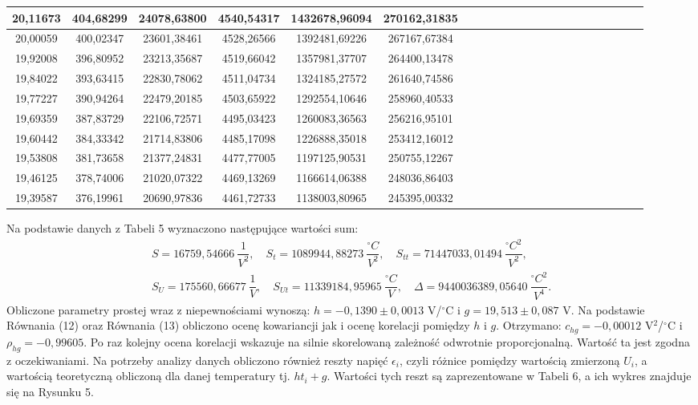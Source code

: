 \documentclass[10pt,a4paper]{article}
\begin{document}
\begin{center}
\begin{table}[h!]
\begin{tabular}{|c|c|c|c|c|c|c|c|c|c|c|c|c|c|c|c|c|c|c|c|c|c|}
20,11673 & 404,68299                & 24078,63800                 & 4540,54317                  & 1432678,96094 & 270162,31835 \\ \hline
20,00059 & 400,02347                & 23601,38461                 & 4528,26566                  & 1392481,69226 & 267167,67384 \\ \hline
19,92008 & 396,80952                & 23213,35687                 & 4519,66042                  & 1357981,37707 & 264400,13478 \\ \hline
19,84022 & 393,63415                & 22830,78062                 & 4511,04734                  & 1324185,27572 & 261640,74586 \\ \hline
19,77227 & 390,94264                & 22479,20185                 & 4503,65922                  & 1292554,10646 & 258960,40533 \\ \hline
19,69359 & 387,83729                & 22106,72571                 & 4495,03423                  & 1260083,36563 & 256216,95101 \\ \hline
19,60442 & 384,33342                & 21714,83806                 & 4485,17098                  & 1226888,35018 & 253412,16012 \\ \hline
19,53808 & 381,73658                & 21377,24831                 & 4477,77005                  & 1197125,90531 & 250755,12267 \\ \hline
19,46125 & 378,74006                & 21020,07322                 & 4469,13269                  & 1166614,06388 & 248036,86403 \\ \hline
19,39587 & 376,19961                & 20690,97836                 & 4461,72733                  & 1138003,80965 & 245395,00332 \\ \hline
\end{tabular}
 \end{table}
 \end{center}

Na podstawie danych z Tabeli 5 wyznaczono następujące wartości sum:
\begin{eqnarray*}
 S=16759,54666 \ \dfrac{1}{V^2}, \quad S_{t}=1089944,88273 \ \dfrac{^{\circ}C}{V^2}, \quad S_{tt}=71447033,01494 \ \dfrac{^{\circ}C^2}{V^2}, \\
  S_{U}=175560,66677 \ \dfrac{1}{V}
, \quad S_{Ut}=11339184,95965 \ \dfrac{^{\circ}C}{V}, \quad \Delta=9440036389,05640 \ \dfrac{^{\circ}C^2}{V^4}.
 \end{eqnarray*}
Obliczone parametry prostej wraz z niepewnościami wynoszą: $h=-0,1390\pm0,0013$ V/$^{\circ}$C i $g=19,513\pm0,087$ V. Na podstawie Równania (12) oraz Równania (13) obliczono ocenę kowariancji jak i ocenę korelacji pomiędzy $h$ i $g$. Otrzymano: $c_{hg}=-0,00012$ V$^2$/$^{\circ}$C i $\rho_{hg}=-0,99605$. Po raz kolejny ocena korelacji wskazuje na silnie skorelowaną zależność odwrotnie proporcjonalną. Wartość ta jest zgodna z oczekiwaniami.  Na potrzeby analizy danych obliczono również reszty napięć $\epsilon_{i}$, czyli różnice pomiędzy wartością zmierzoną $U_{i}$, a wartością teoretyczną obliczoną dla danej temperatury tj. $ht_{i}+g$. Wartości tych reszt są zaprezentowane w Tabeli 6, a ich wykres znajduje się na Rysunku 5.
\end{document}
